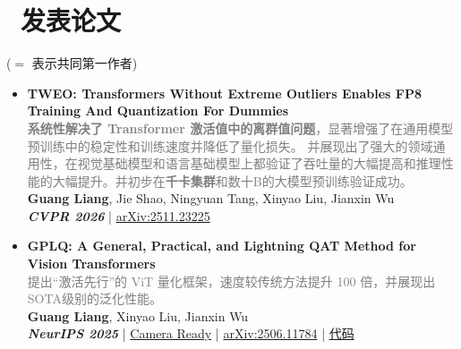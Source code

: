 \documentclass[10pt]{resume}
\begin{document}
\section{\faBook\ 发表论文}
($=$ 表示共同第一作者)
\begin{itemize}[leftmargin=*, parsep=0.5ex]

    \item \textbf{TWEO: Transformers Without Extreme Outliers Enables FP8 Training And Quantization For Dummies} \\
    [0.2em]
        \textcolor{gray}{\small{\textbf{系统性解决了 Transformer 激活值中的离群值问题}，显著增强了在通用模型预训练中的稳定性和训练速度并降低了量化损失。 并展现出了强大的领域通用性，在视觉基础模型和语言基础模型上都验证了吞吐量的大幅提高和推理性能的大幅提升。并初步在\textbf{千卡集群}和数十B的大模型预训练验证成功。}} \\
          \small{
          \textbf{Guang Liang}, Jie Shao, Ningyuan Tang, Xinyao Liu, Jianxin Wu \\
          \textbf{\textit{CVPR 2026}} |
          \href{https://arxiv.org/abs/2511.23225}{arXiv:2511.23225}
          }
          
    \item \textbf{GPLQ: A General, Practical, and Lightning QAT Method for Vision Transformers} \\
    [0.2em]
        \textcolor{gray}{\small{提出“激活先行”的 ViT 量化框架，速度较传统方法提升 100 倍，并展现出SOTA级别的泛化性能。}}\\
          \small{
          \textbf{Guang Liang}, Xinyao Liu, Jianxin Wu \\
           \textbf{{\textit{ NeurIPS 2025}}} |
           \href{https://cs.nju.edu.cn/wujx/paper/GPLQ_NeurIPS2025.pdf}{Camera Ready} |
           \href{https://arxiv.org/abs/2506.11784}{arXiv:2506.11784} |
           \href{https://github.com/wujx2001/GPLQ}{代码}}



\end{itemize}
\end{document}
